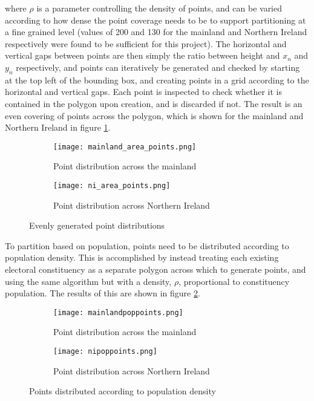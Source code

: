 \documentclass{article}
\begin{document}
where $\rho$ is a parameter controlling the density of points, and can be varied according to how dense the point coverage needs to be to support partitioning at a fine grained level
(values of 200 and 130 for the mainland and Northern Ireland respectively were found to be sufficient for this project). The horizontal and vertical gaps between points are then simply the ratio between
height and $x_n$ and $y_n$ respectively, and points can iteratively be generated and checked by starting at the top left of the bounding box, and creating points in a grid according to the horizontal
and vertical gaps. Each point is inspected to check whether it is contained in the polygon upon creation, and is discarded if not. The result is an even covering of points across the polygon, which is 
shown for the mainland and Northern Ireland in figure \ref{fig:areapoints}.

\begin{figure}[H]
    \centering
    \begin{subfigure}{0.48\textwidth}
        \centering
        \texttt{[image: mainland\_area\_points.png]}
        \caption{Point distribution across the mainland}
    \end{subfigure}
    \begin{subfigure}{0.48\textwidth}
        \centering
        \texttt{[image: ni\_area\_points.png]}
        \caption{Point distribution across Northern Ireland}
    \end{subfigure}
    \caption{Evenly generated point distributions}
    \label{fig:areapoints}
\end{figure}

To partition based on population, points need to be distributed according to population density. This is accomplished by instead treating each existing electoral constituency as 
a separate polygon across which to generate points, and using the same algorithm but with a density, $\rho$, proportional to constituency population. The results of this are
shown in figure \ref{fig:poppoints}.

\begin{figure}[H]
    \centering
    \begin{subfigure}{0.48\textwidth}
        \centering
        \texttt{[image: mainlandpoppoints.png]}
        \caption{Point distribution across the mainland}
    \end{subfigure}
    \begin{subfigure}{0.48\textwidth}
        \centering
        \texttt{[image: nipoppoints.png]}
        \caption{Point distribution across Northern Ireland}
    \end{subfigure}
    \caption{Points distributed according to population density}
    \label{fig:poppoints}
\end{figure}
\end{document}

